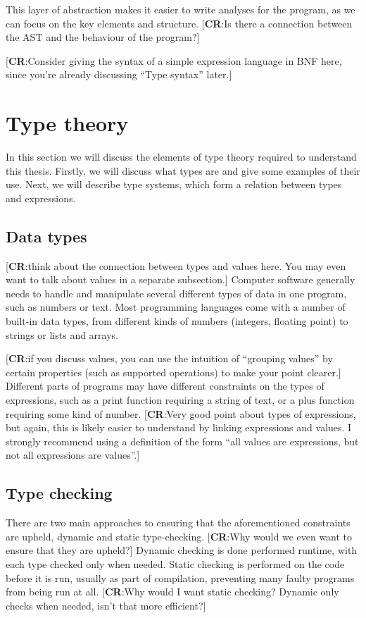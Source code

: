 \documentclass[nofilelist]{cslthse-msc}
\newcommand{\CR}[1]{\textcolor{green!60!black}{[\textbf{CR}:#1]}}
\begin{document}
This layer of abstraction makes it easier to write analyses for the program, as we can focus on the key elements and structure.
\CR{Is there a connection between the AST and the behaviour of the program?}

\CR{Consider giving the syntax of a simple expression language in BNF here, since you're already discussing ``Type syntax'' later.}

\section{Type theory}
In this section we will discuss the elements of type theory required to understand this thesis.
Firstly, we will discuss what types are and give some examples of their use.
Next, we will describe type systems, which form a relation between types and expressions.

\subsection{Data types}
\CR{think about the connection between types and values here.  You may even want to talk about values in a separate subsection.}
Computer software generally needs to handle and manipulate several different types of data in one program, such as numbers or text.
Most programming languages come with a number of built-in data types, from different kinds of numbers (integers, floating point) to strings or lists and arrays.

\CR{if you discuss values, you can use the intuition of ``grouping values'' by certain properties (such as supported operations) to make your point clearer.}
Different parts of programs may have different constraints on the types of expressions, such as a print function requiring a string of text, or a plus function requiring some kind of number.
\CR{Very good point about types of expressions, but again, this is likely easier to understand by linking expressions and values.
  I strongly recommend using a definition of the form ``all values are expressions, but not all expressions are values''.}

\subsection{Type checking}
There are two main approaches to ensuring that the aforementioned constraints are upheld, dynamic and static type-checking.
\CR{Why would we even want to ensure that they are upheld?}
Dynamic checking is done performed runtime, with each type checked only when needed.
Static checking is performed on the code before it is run, usually as part of compilation, preventing many faulty programs from being run at all.
\CR{Why would I want static checking?  Dynamic only checks when needed, isn't that more efficient?}
\end{document}
